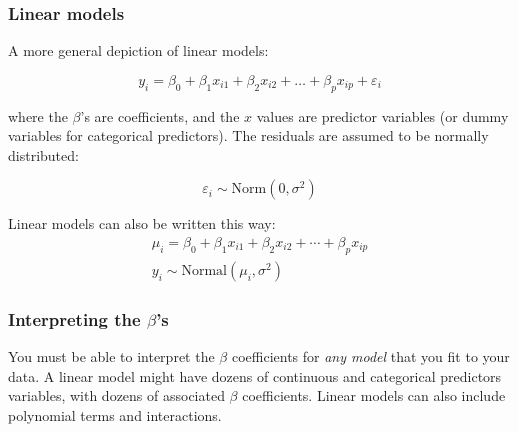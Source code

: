 \documentclass[color=usenames,dvipsnames]{beamer}\usepackage[]{graphicx}\usepackage[]{xcolor}
\begin{document}
\begin{frame}
  \frametitle{Linear models}
    A more general depiction of linear models:

\[
y_i = \beta_0 + \beta_1 x_{i1} + \beta_2 x_{i2} + \ldots + \beta_p x_{ip} + \varepsilon_i
\]

where the $\beta$'s are coefficients, and the $x$ values are predictor
variables (or dummy variables for categorical predictors). %
The residuals are assumed to be normally distributed:

\[
  \varepsilon_i \sim \mathrm{Norm}(0, \sigma^2)
\]

\pause

\vfill %



Linear models can also be written this way:
\begin{gather*}
  \mu_i = \beta_0 + \beta_1 x_{i1} + \beta_2 x_{i2} + \cdots + \beta_p x_{ip} \\
  y_i \sim \mathrm{Normal}(\mu_i, \sigma^2)
\end{gather*}

\end{frame}




\begin{frame}
  \frametitle{Interpreting the $\beta$'s}
You must be able to interpret the $\beta$
coefficients for {\it any model} that you fit to your data.
\pause
\vfill
A linear model might have dozens of continuous and categorical
predictors variables, with dozens of associated $\beta$ coefficients.
\pause
\vfill
Linear models can also include polynomial terms and interactions. 
\end{frame}
\end{document}
